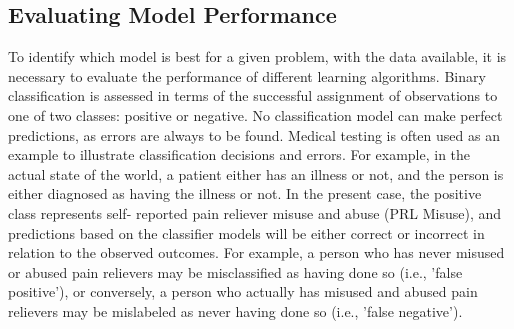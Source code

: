 \documentclass[sigconf]{acmart}
\begin{document}

\subsection{Evaluating Model Performance}

To identify which model is best for a given problem, with the data available, 
it is necessary to evaluate the performance of different learning algorithms. 
Binary classification is assessed in terms of the successful assignment of 
observations to one of two classes: positive or negative. No classification 
model can make perfect predictions, as errors are always to be found. Medical 
testing is often used as an example to illustrate classification decisions 
and errors. For example, in the actual state of the world, a patient either 
has an illness or not, and the person is either diagnosed as having the 
illness or not. In the present case, the positive class represents self-
reported pain reliever misuse and abuse (PRL Misuse), and predictions based on 
the classifier models will be either correct or incorrect in relation to the 
observed outcomes. For example, a person who has never misused or abused pain 
relievers may be misclassified as having done so (i.e., 'false positive'), or 
conversely, a person who actually has misused and abused pain relievers may 
be mislabeled as never having done so (i.e., 'false negative').

\end{document}
